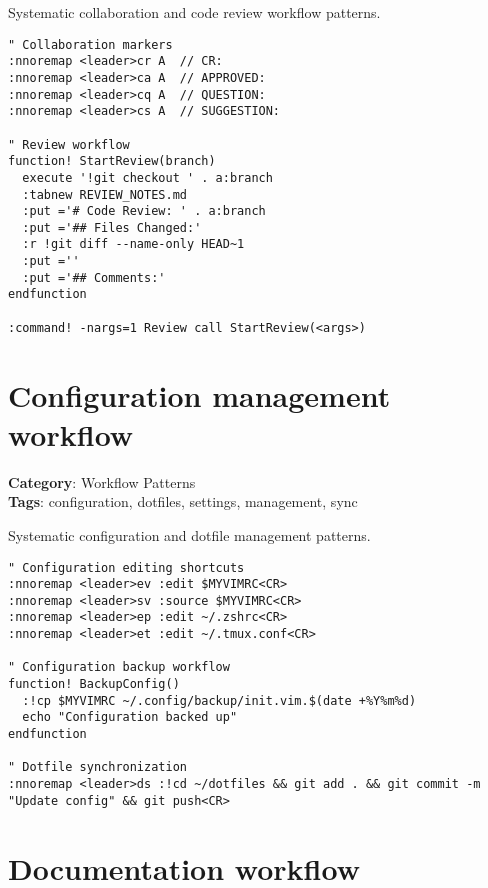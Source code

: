 {{{{{{{{{{{{{{{{{{Systematic collaboration and code review workflow patterns.

\begin{Exa*}{}
\begin{Verbatim}[fontsize=\footnotesize, breaklines, breakanywhere]
" Collaboration markers
:nnoremap <leader>cr A  // CR: 
:nnoremap <leader>ca A  // APPROVED: 
:nnoremap <leader>cq A  // QUESTION: 
:nnoremap <leader>cs A  // SUGGESTION: 

" Review workflow
function! StartReview(branch)
  execute '!git checkout ' . a:branch
  :tabnew REVIEW_NOTES.md
  :put ='# Code Review: ' . a:branch
  :put ='## Files Changed:'
  :r !git diff --name-only HEAD~1
  :put =''
  :put ='## Comments:'
endfunction

:command! -nargs=1 Review call StartReview(<args>)
\end{Verbatim}
\end{Exa*}

\section{Configuration management workflow}

\textbf{Category}: Workflow Patterns\\ \textbf{Tags}: configuration, dotfiles, settings, management, sync
\vspace{0.5cm}

Systematic configuration and dotfile management patterns.

\begin{Exa*}{}
\begin{Verbatim}[fontsize=\footnotesize, breaklines, breakanywhere]
" Configuration editing shortcuts  
:nnoremap <leader>ev :edit $MYVIMRC<CR>
:nnoremap <leader>sv :source $MYVIMRC<CR>
:nnoremap <leader>ep :edit ~/.zshrc<CR>
:nnoremap <leader>et :edit ~/.tmux.conf<CR>

" Configuration backup workflow
function! BackupConfig()
  :!cp $MYVIMRC ~/.config/backup/init.vim.$(date +%Y%m%d)
  echo "Configuration backed up"
endfunction

" Dotfile synchronization
:nnoremap <leader>ds :!cd ~/dotfiles && git add . && git commit -m "Update config" && git push<CR>
\end{Verbatim}
\end{Exa*}

\section{Documentation workflow}

}}}}}}}}}}}}}}}}}}
